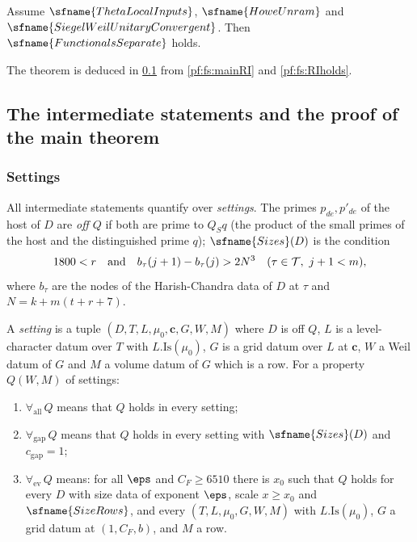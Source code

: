 \begin{theorem}\label{pf:fs:main}
Assume $\sfname{ThetaLocalInputs}$, $\sfname{HoweUnram}$ and $\sfname{SiegelWeilUnitaryConvergent}$. Then
$\sfname{FunctionalsSeparate}$ holds.
\end{theorem}

The theorem is deduced in \cref{sec:pf:fs:assembly} from \cref{pf:fs:mainRI} and \cref{pf:fs:RIholds}.

\subsection{The intermediate statements and the proof of the main theorem}\label{sec:pf:fs:assembly}

\subsubsection{Settings}
All intermediate statements quantify over \emph{settings}. The primes $p_{de},p'_{de}$ of the host of $D$ are \emph{off $Q$} if
both are prime to $Q_Sq$ (the product of the small primes of the host and the distinguished prime $q$); $\sfname{Sizes}(D)$ is
the condition
\begin{equation}\label{eq:pf:fs:sizes}
1800<r\quad\text{and}\quad b_\tau(j+1)-b_\tau(j)>2N^3\quad(\tau\in\mathcal T,\ j+1<m),
\end{equation}
where $b_\tau$ are the nodes of the Harish-Chandra data of $D$ at $\tau$ and $N=k+m(t+r+7)$.

\begin{definition}\label{pf:fs:settings}
A \emph{setting} is a tuple $(D,T,L,\mu_0,\mathbf c,G,W,M)$ where $D$ is off $Q$, $L$ is a level-character datum over $T$ with
$L.\mathrm{Is}(\mu_0)$, $G$ is a grid datum over $L$ at $\mathbf c$, $W$ a Weil datum of $G$ and $M$ a volume datum of $G$ which
is a row. For a property $Q(W,M)$ of settings:
\begin{enumerate}[label=(\alph*)]
\item $\forall_{\mathrm{all}}\,Q$ means that $Q$ holds in every setting;
\item $\forall_{\mathrm{gap}}\,Q$ means that $Q$ holds in every setting with $\sfname{Sizes}(D)$ and $c_{\mathrm{gap}}=1$;
\item $\forall_{\mathrm{ev}}\,Q$ means: for all $\eps$ and $C_F\ge6510$ there is $x_0$ such that $Q$ holds for every $D$ with size
data of exponent $\eps$, scale $x\ge x_0$ and $\sfname{SizeRows}$, and every $(T,L,\mu_0,G,W,M)$ with $L.\mathrm{Is}(\mu_0)$, $G$
a grid datum at $(1,C_F,b)$, and $M$ a row.
\end{enumerate}
\end{definition}

